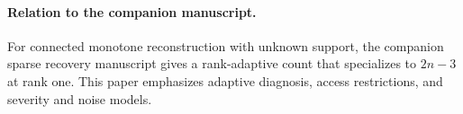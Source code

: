 \documentclass[11pt,letterpaper]{article}
\begin{document}
\paragraph{Relation to the companion manuscript.} For connected monotone reconstruction with unknown support, the companion sparse recovery manuscript gives a rank-adaptive count that specializes to $2n-3$ at rank one. This paper emphasizes adaptive diagnosis, access restrictions, and severity and noise models.



\end{document}
